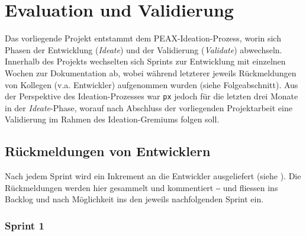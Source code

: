 \section{Evaluation und Validierung}

Das vorliegende Projekt entstammt dem PEAX-Ideation-Prozess, worin sich Phasen der Entwicklung (\textit{Ideate}) und der Validierung (\textit{Validate}) abwechseln. Innerhalb des Projekts wechselten sich Sprints zur Entwicklung mit einzelnen Wochen zur Dokumentation ab, wobei während letzterer jeweils Rückmeldungen von Kollegen (v.a. Entwickler) aufgenommen wurden (siehe Folgeabschnitt). Aus der Perspektive des Ideation-Prozesses war \texttt{px} jedoch für die letzten drei Monate in der \textit{Ideate}-Phase, worauf nach Abschluss der vorliegenden Projektarbeit eine Validierung im Rahmen des Ideation-Gremiums folgen soll.

\subsection{Rückmeldungen von Entwicklern}

Nach jedem Sprint wird ein Inkrement an die Entwickler ausgeliefert (siehe ). Die Rückmeldungen werden hier gesammelt und kommentiert ‒ und fliessen ins Backlog und nach Möglichkeit ins den jeweils nachfolgenden Sprint ein.

\subsubsection{Sprint 1}
\label{sec:Feedback-Sprint1}

